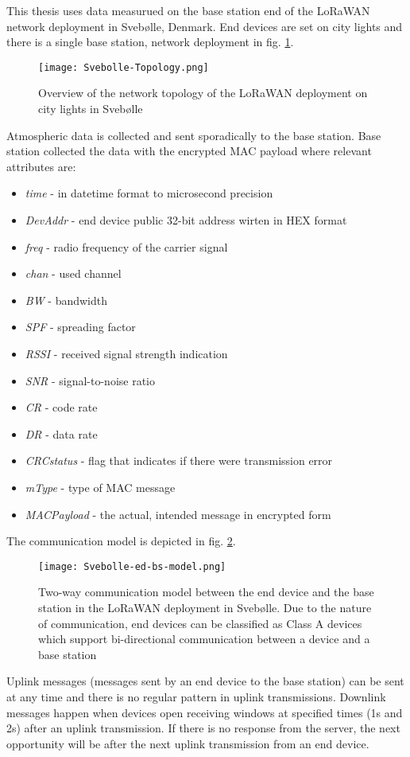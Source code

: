 This thesis uses data measurued on the base station end of the LoRaWAN network deployment in Svebølle, Denmark. 
End devices are set on city lights and there is a single base station, network deployment in fig. \ref{fig:svebolle}.
\begin{figure}[h]
    \centering
    \texttt{[image: Svebolle-Topology.png]}
    \caption{Overview of the network topology of the LoRaWAN deployment on city lights in Svebølle}
    \label{fig:svebolle}
\end{figure}
Atmospheric data is collected and sent sporadically to the base station.
Base station collected the data with the encrypted MAC payload where relevant attributes are:
\begin{itemize}
    \item \textit{time} - in datetime format to microsecond precision
    \item \textit{DevAddr} - end device public 32-bit address wirten in HEX format
    \item \textit{freq} - radio frequency of the carrier signal
    \item \textit{chan} - used channel
    \item \textit{BW} - bandwidth
    \item \textit{SPF} - spreading factor
    \item \textit{RSSI} - received signal strength indication
    \item \textit{SNR} - signal-to-noise ratio
    \item \textit{CR} - code rate
    \item \textit{DR} - data rate
    \item \textit{CRCstatus} - flag that indicates if there were transmission error
    \item \textit{mType} - type of MAC message
    \item \textit{MACPayload} - the actual, intended message in encrypted form
\end{itemize}

The communication model is depicted in fig. \ref{fig:sv_cm}.
\begin{figure}[h]
    \centering
    \texttt{[image: Svebolle-ed-bs-model.png]}
    \caption{Two-way communication model between the end device and the base station in the LoRaWAN deployment in Svebølle. Due to the nature of communication, end devices can be classified as Class A devices which support bi-directional communication between a device and a base station}
    \label{fig:sv_cm}
\end{figure}
Uplink messages (messages sent by an end device to the base station) can be sent at any time and there is no regular pattern in uplink transmissions. 
Downlink messages happen when devices open receiving windows at specified times (1s and 2s) after an uplink transmission.
If there is no response from the server, the next opportunity will be after the next uplink transmission from an end device.

